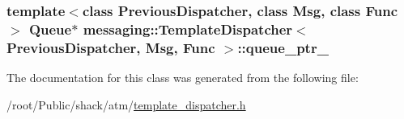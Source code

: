 \hypertarget{classmessaging_1_1TemplateDispatcher_a1c84a8173b54823d7b95db4d4865e134}{
\subsubsection[{queue\-\_\-ptr\-\_\-}]{\setlength{\rightskip}{0pt plus 5cm}template$<$class Previous\-Dispatcher, class Msg, class Func$>$ {\bf Queue}$\ast$ {\bf messaging\-::\-Template\-Dispatcher}$<$ Previous\-Dispatcher, Msg, Func $>$\-::queue\-\_\-ptr\-\_\-\hspace{0.3cm}{\ttfamily [private]}}}\label{classmessaging_1_1TemplateDispatcher_a1c84a8173b54823d7b95db4d4865e134}


The documentation for this class was generated from the following file\-:\begin{DoxyCompactItemize}
\item 
/root/\-Public/shack/atm/\hyperlink{template__dispatcher_8h}{template\-\_\-dispatcher.\-h}\end{DoxyCompactItemize}
